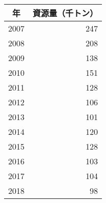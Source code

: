\begin{tabular}{cr}
\multicolumn{1}{c}{年}&\multicolumn{1}{c}{資源量（千トン）}\\\hline
2007&247\\
2008&208\\
2009&138\\
2010&151\\
2011&128\\
2012&106\\
2013&101\\
2014&120\\
2015&128\\
2016&103\\
2017&104\\
2018&98\\
\end{tabular}
